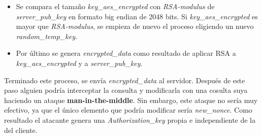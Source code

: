 \begin{enumerate}
\begin{enumerate}
\begin{itemize}
			\item Se compara el tamaño \emph{key\_aes\_encrypted} con \emph{RSA-modulus} de \emph{server\_pub\_key} en formato big endian de 2048 bits. Si \emph{key\_aes\_encrypted} es mayor que \emph{RSA-modulus}, se empieza de nuevo el proceso eligiendo un nuevo \emph{random\_temp\_key}.
			\item Por último se genera \emph{encrypted\_data} como resultado de aplicar RSA a \emph{key\_aes\_encrypted} y a \emph{server\_pub\_key}.
		\end{itemize}
	\end{enumerate}

	Terminado este proceso, se envía \emph{encrypted\_data} al servidor.
	Después de este paso alguien podría interceptar la consulta y modificarla con una cosulta suya haciendo un ataque \textbf{man-in-the-middle}. 
	Sin embargo, este ataque no sería muy efectivo, ya que el único elemento que podría modificar sería \emph{new\_nonce}. Como resultado el atacante genera una \emph{Authorization\_key} propia e independiente de la del cliente.


\end{enumerate}
